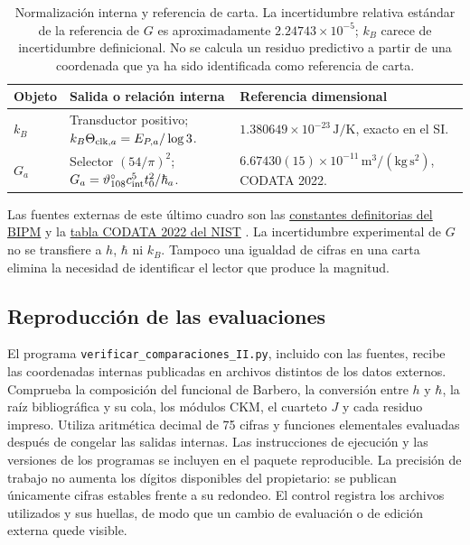 \begin{table}[htbp]
\centering\small
\begin{tabularx}{\linewidth}{@{}lXX@{}}
\toprule
Objeto & Salida o relación interna & Referencia dimensional\\
\midrule
\(k_B\) & Transductor positivo; \(k_B\Theta_{{\rm clk},a}=E_{P,a}/\log3\).
& \(1.380649\times10^{-23}\,\mathrm{J/K}\), exacto en el SI.\\[4pt]
\(G_a\) & Selector \((54/\pi)^2\); \(G_a=\vartheta_{108}^{\circ}c_{\rm int}^5t_0^2/\hbar_a\).
& \(6.67430(15)\times10^{-11}\,\mathrm{m^3/(kg\,s^2)}\), CODATA 2022.\\
\bottomrule
\end{tabularx}
\caption{Normalización interna y referencia de carta. La incertidumbre
relativa estándar de la referencia de \(G\) es aproximadamente
\(2.24743\times10^{-5}\); \(k_B\) carece de incertidumbre definicional.
No se calcula un residuo predictivo a partir de una coordenada que ya
ha sido identificada como referencia de carta.}
\label{ii:tab:ii-kb-g-cartas}
\end{table}

Las fuentes externas de este último cuadro son las
\href{https://www.bipm.org/en/measurement-units/si-defining-constants}
{constantes definitorias del BIPM} y la
\href{https://physics.nist.gov/cuu/Constants/Table/allascii.txt}
{tabla CODATA 2022 del NIST} \cite{ii:codata2022}.
La incertidumbre experimental de \(G\) no se transfiere a \(h\),
\(\hbar\) ni \(k_B\). Tampoco una igualdad de cifras en una carta
elimina la necesidad de identificar el lector que produce la magnitud.

\subsection{Reproducción de las evaluaciones}

El programa \texttt{verificar\_comparaciones\_II.py}, incluido con las
fuentes, recibe las coordenadas internas publicadas en archivos distintos
de los datos externos. Comprueba la composición del funcional de Barbero,
la conversión entre \(h\) y \(\hbar\), la raíz bibliográfica y su cola,
los módulos CKM, el cuarteto \(J\) y cada residuo impreso. Utiliza
aritmética decimal de 75 cifras y funciones elementales evaluadas después
de congelar las salidas internas. Las instrucciones de ejecución
y las versiones de los programas se incluyen en el paquete reproducible.
La precisión de trabajo no aumenta los dígitos disponibles del
propietario: se publican únicamente cifras estables frente a su redondeo.
El control registra los archivos utilizados y sus huellas, de modo que
un cambio de evaluación o de edición externa quede visible.

